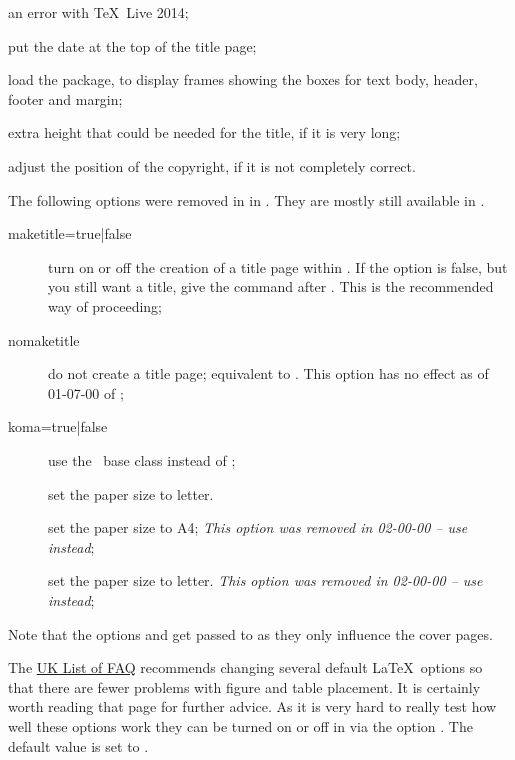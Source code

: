\begin{description}
  an error with \TeX\ Live 2014;
\item[\Option{datetop=true|{\normalfont false}}] put the date at the top of the title page;
\item[\Option{showframe={\normalfont true}|false}] load the  package, to display frames showing the boxes for text body, header, footer and margin;
\item[\Option{titleextraheight=0em}] extra height that could be needed for the title, if it is very long;
\item[\Option{copyrightoffset=0em}] adjust the position of the copyright,
  if it is not completely correct.
\end{description}

The following options were removed in  in .
They are mostly still available in .
\begin{description}
\item[maketitle={\normalfont true}|false] turn on or off the creation of a title page within .
  If the option is false, but you still want a title, give the command  after
  \verb||.
  This is the recommended way of proceeding;
\item[nomaketitle] do not create a title page; equivalent to .
  This option has no effect as of  01-07-00 of ;
\item[koma=true|{\normalfont false}] use the \KOMAScript\ base class  instead of ;
\item[] set the paper size to letter.
\item[] set the paper size to A4;
  \emph{This option was removed in  02-00-00
  -- use  instead};
\item[] set the paper size to letter.
  \emph{This option was removed in  02-00-00
  -- use  instead};
\end{description}
Note that the options  and  get passed to 
as they only influence the cover pages.

The
\href{http://www.tex.ac.uk/cgi-bin/texfaq2html?label=floats}{UK List of FAQ}
recommends changing several default \LaTeX\ options so that there are fewer problems
with figure and table placement.
It is certainly worth reading that page for further advice.
As it is very hard to really test how well these options work
they can be turned on or off in  via the option .
The default value is set to .

